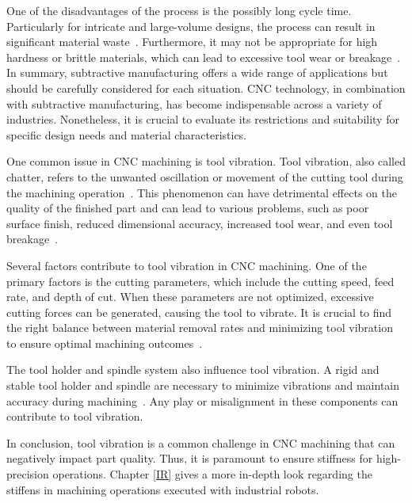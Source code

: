 One of the disadvantages of the process is the possibly long cycle time. Particularly for intricate and large-volume designs, the process can result in significant material waste~\cite{Faludi.2015}. Furthermore, it may not be appropriate for high hardness or brittle materials, which can lead to excessive tool wear or breakage~\cite{Hesser.2019}. In summary, subtractive manufacturing offers a wide range of applications but should be carefully considered for each situation. CNC technology, in combination with subtractive manufacturing, has become indispensable across a variety of industries. Nonetheless, it is crucial to evaluate its restrictions and suitability for specific design needs and material characteristics.


One common issue in CNC machining is tool vibration. Tool vibration, also called chatter, refers to the unwanted oscillation or movement of the cutting tool during the machining operation~\cite{YUE.2019}. This phenomenon can have detrimental effects on the quality of the finished part and can lead to various problems, such as poor surface finish, reduced dimensional accuracy, increased tool wear, and even tool breakage~\cite{Aslan.2018}.

Several factors contribute to tool vibration in CNC machining. One of the primary factors is the cutting parameters, which include the cutting speed, feed rate, and depth of cut. When these parameters are not optimized, excessive cutting forces can be generated, causing the tool to vibrate. It is crucial to find the right balance between material removal rates and minimizing tool vibration to ensure optimal machining outcomes~\cite{GiorgioBort.2016}.

The tool holder and spindle system also influence tool vibration. A rigid and stable tool holder and spindle are necessary to minimize vibrations and maintain accuracy during machining~\cite{Wan.2019}. Any play or misalignment in these components can contribute to tool vibration. %

In conclusion, tool vibration is a common challenge in CNC machining that can negatively impact part quality. Thus, it is paramount to ensure stiffness for high-precision operations.
Chapter \ref{IR} gives a more in-depth look regarding the stiffens in machining operations executed with industrial robots.

